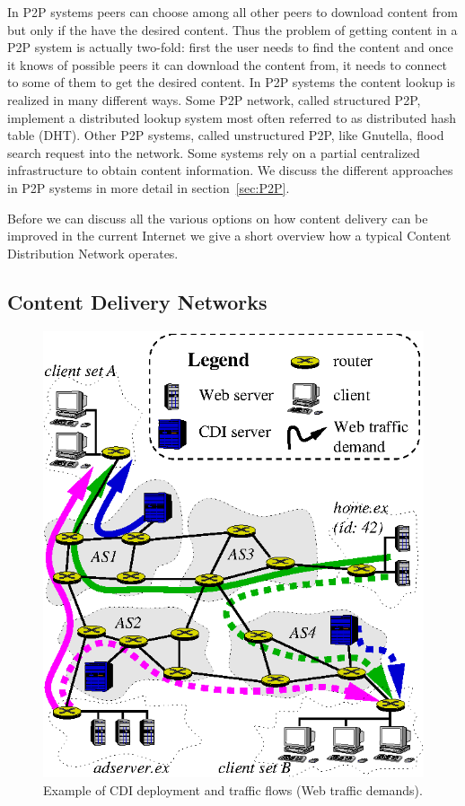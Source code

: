 In P2P systems peers can choose among all other peers to download content from
but only if the have the desired content. Thus the problem of getting content
in a P2P system is actually two-fold: first the user needs to find the content
and once it knows of possible peers it can download the content from, it needs
to connect to some of them to get the desired content.  In P2P systems the
content lookup is realized in many different ways. Some P2P network, called
structured P2P, implement a distributed lookup system most often referred to as
distributed hash table (DHT). Other P2P systems, called unstructured P2P, like
Gnutella, flood search request into the network.  Some systems rely on a
partial centralized infrastructure to obtain content information. We discuss
the different approaches in P2P systems in more detail in
section~\ref{sec:P2P}.

Before we can discuss all the various options on how content delivery can be
improved in the current Internet we give a short overview how a typical Content
Distribution Network operates.


\subsection{Content Delivery Networks} \label{sec:content_delivery}

\begin{figure} \begin{center}
\includegraphics[width=0.7\linewidth]{figures/flows-example.eps} 
\end{center}
\caption{Example of CDI deployment and traffic flows (Web traffic demands).}
\label{fig:aka:cdn} \end{figure}

